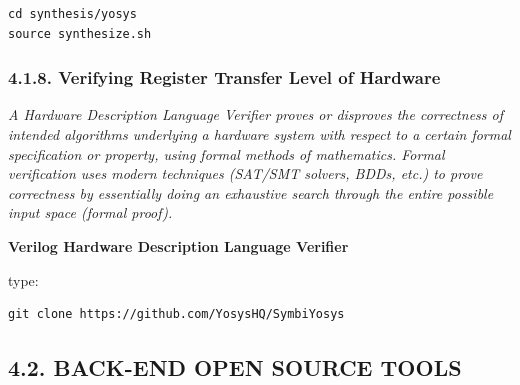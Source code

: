 \documentclass[
]{article}
\begin{document}
\begin{verbatim}
cd synthesis/yosys
source synthesize.sh
\end{verbatim}

\hypertarget{verifying-register-transfer-level-of-hardware-1}{%
\subsubsection{4.1.8. Verifying Register Transfer Level of
Hardware}\label{verifying-register-transfer-level-of-hardware-1}}

\emph{A Hardware Description Language Verifier proves or disproves the
correctness of intended algorithms underlying a hardware system with
respect to a certain formal specification or property, using formal
methods of mathematics. Formal verification uses modern techniques
(SAT/SMT solvers, BDDs, etc.) to prove correctness by essentially doing
an exhaustive search through the entire possible input space (formal
proof).}

\textbf{Verilog Hardware Description Language Verifier}

type:

\begin{verbatim}
git clone https://github.com/YosysHQ/SymbiYosys
\end{verbatim}

\hypertarget{back-end-open-source-tools-2}{%
\subsection{4.2. BACK-END OPEN SOURCE
TOOLS}\label{back-end-open-source-tools-2}}
\end{document}
